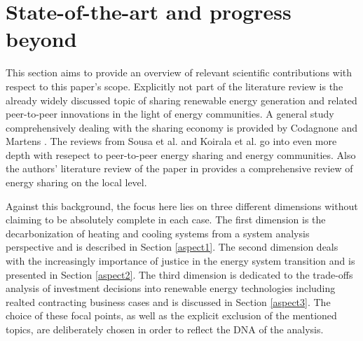 \section{State-of-the-art and progress beyond}\label{stateoftheart}
This section aims to provide an overview of relevant scientific contributions with respect to this paper's scope. Explicitly not part of the literature review is the already widely discussed topic of sharing renewable energy generation and related peer-to-peer innovations in the light of energy communities. A general study comprehensively dealing with the sharing economy is provided by Codagnone and Martens \cite{codagnone2016scoping}. The reviews from Sousa et al. \cite{sousa2019peer} and Koirala et al. \cite{koirala2016energetic} go into even more depth with resepect to peer-to-peer energy sharing and energy communities. Also the authors' literature review of the paper in \cite{zwickl2021open} provides a comprehensive review of energy sharing on the local level.\vspace{0.5cm}

Against this background, the focus here lies on three different dimensions without claiming to be absolutely complete in each case. The first dimension is the decarbonization of heating and cooling systems from a system analysis perspective and is described in Section \ref{aspect1}. The second dimension deals with the increasingly importance of justice in the energy system transition and is presented in Section \ref{aspect2}. The third dimension is dedicated to the trade-offs analysis of investment decisions into renewable energy technologies including realted contracting business cases and is discussed in Section \ref{aspect3}. The choice of these focal points, as well as the explicit exclusion of the mentioned topics, are deliberately chosen in order to reflect the DNA of the analysis. 

